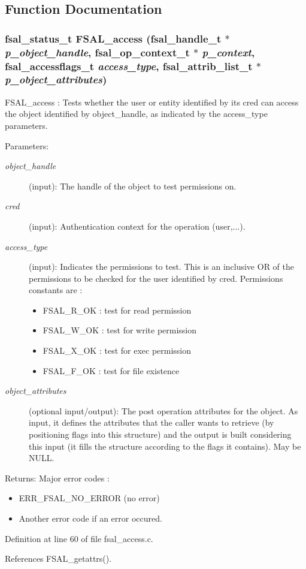 \subsection{Function Documentation}
\subsubsection{\setlength{\rightskip}{0pt plus 5cm}fsal\_\-status\_\-t FSAL\_\-access (fsal\_\-handle\_\-t $\ast$ {\em p\_\-object\_\-handle}, fsal\_\-op\_\-context\_\-t $\ast$ {\em p\_\-context}, fsal\_\-accessflags\_\-t {\em access\_\-type}, fsal\_\-attrib\_\-list\_\-t $\ast$ {\em p\_\-object\_\-attributes})}\label{fsal__access_8c_a1}


FSAL\_\-access : Tests whether the user or entity identified by its cred can access the object identified by object\_\-handle, as indicated by the access\_\-type parameters.

\begin{Desc}
\item[Parameters:]
\begin{description}
\item[{\em object\_\-handle}](input): The handle of the object to test permissions on. \item[{\em cred}](input): Authentication context for the operation (user,...). \item[{\em access\_\-type}](input): Indicates the permissions to test. This is an inclusive OR of the permissions to be checked for the user identified by cred. Permissions constants are :\begin{itemize}
\item FSAL\_\-R\_\-OK : test for read permission\item FSAL\_\-W\_\-OK : test for write permission\item FSAL\_\-X\_\-OK : test for exec permission\item FSAL\_\-F\_\-OK : test for file existence \end{itemize}
\item[{\em object\_\-attributes}](optional input/output): The post operation attributes for the object. As input, it defines the attributes that the caller wants to retrieve (by positioning flags into this structure) and the output is built considering this input (it fills the structure according to the flags it contains). May be NULL.\end{description}
\end{Desc}
\begin{Desc}
\item[Returns:]Major error codes :\begin{itemize}
\item ERR\_\-FSAL\_\-NO\_\-ERROR (no error)\item Another error code if an error occured. \end{itemize}
\end{Desc}


Definition at line 60 of file fsal\_\-access.c.

References FSAL\_\-getattrs().